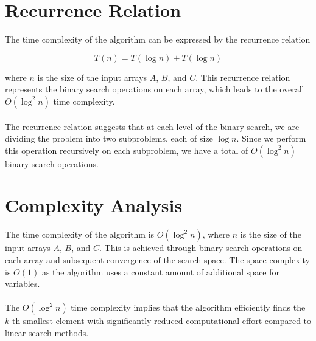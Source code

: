 \documentclass{article}
\begin{document}
\section{Recurrence Relation}
The time complexity of the algorithm can be expressed by the recurrence relation


\[ T(n) = T(\log n) + T(\log n) \]

where $n$ is the size of the input arrays $A$, $B$, and $C$. This recurrence relation represents the binary search operations on each array, which leads to the overall $O(\log^2 n)$ time complexity.
\\\\
The recurrence relation suggests that at each level of the binary search, we are dividing the problem into two subproblems, each of size $\log n$. Since we perform this operation recursively on each subproblem, we have a total of $O(\log^2 n)$ binary search operations.

\section{Complexity Analysis}
The time complexity of the algorithm is $O(\log^2 n)$, where $n$ is the size of the input arrays $A$, $B$, and $C$. This is achieved through binary search operations on each array and subsequent convergence of the search space. The space complexity is $O(1)$ as the algorithm uses a constant amount of additional space for variables.
\\\\
The $O(\log^2 n)$ time complexity implies that the algorithm efficiently finds the $k$-th smallest element with significantly reduced computational effort compared to linear search methods.
\end{document}
